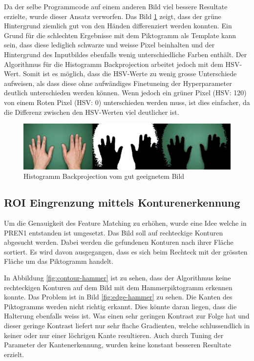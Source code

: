 Da der selbe Programmcode auf einem anderen Bild viel bessere Resultate erzielte, wurde dieser Ansatz verworfen. Das Bild \ref{fig:backprojection-hand} zeigt, dass der grüne Hintergrund ziemlich gut von den Händen differenziert werden konnten. Ein Grund für die schlechten Ergebnisse mit dem Piktogramm als Template kann sein, dass diese lediglich schwarze und weisse Pixel beinhalten und der Hintergrund des Inputbildes ebenfalls wenig unterschiedliche Farben enthält. Der Algorithmus für die Histogramm Backprojection arbeitet jedoch mit dem HSV-Wert. Somit ist es möglich, dass die HSV-Werte zu wenig grosse Unterschiede aufweisen, als dass diese ohne aufwändiges Finetuneing der Hyperparameter deutlich unterschieden werden können. Wenn jedoch ein grüner Pixel (HSV: 120) von einem Roten Pixel (HSV: 0) unterschieden werden muss, ist dies einfacher, da die Differenz zwischen den HSV-Werten viel deutlicher ist. 

\begin{figure}[H]
  \includegraphics[width=1\textwidth]{img/piktogrammerkennung/hand_backprojection.jpg}
  \centering
  \caption{Histogramm Backprojection vom gut geeignetem Bild}
  \label{fig:backprojection-hand}
\end{figure}


\subsection{ROI Eingrenzung mittels Konturenerkennung}
Um die Genauigkeit des Feature Matching zu erhöhen, wurde eine Idee welche in PREN1 entstanden ist umgesetzt. Das Bild soll auf rechteckige Konturen abgesucht werden. Dabei werden die gefundenen Konturen nach ihrer Fläche sortiert. Es wird davon ausgegangen, dass es sich beim Rechteck mit der grössten Fläche um das Piktogramm handelt.

In Abbildung \ref{fig:contour-hammer} ist zu sehen, dass der Algorithmus keine rechteckigen Konturen auf dem Bild mit dem Hammerpiktogramm erkennen konnte. Das Problem ist in Bild \ref{fig:edge-hammer} zu sehen. Die Kanten des Piktogramms werden nicht richtig erkannt. Dies könnte daran liegen, dass die Halterung ebenfalls weiss ist. Was einen sehr geringen Kontrast zur Folge hat und dieser geringe Kontrast liefert nur sehr flache Gradienten, welche schlussendlich in keiner oder nur einer löchrigen Kante resultieren. Auch durch Tuning der Parameter der Kantenerkennung, wurden keine konstant besseren Resultate erzielt.

